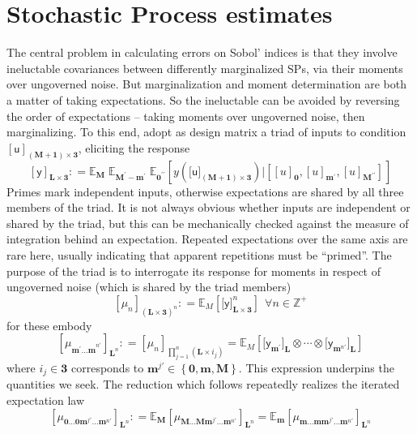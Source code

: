 \documentclass[preprint,12pt]{elsarticle}
\newcommand*{\M}[1]{\ensuremath{#1}\xspace}
\newcommand*{\x}{\times}
\newcommand*{\mi}[1]{\mathbf{#1}}
\newcommand*{\st}[1]{\mathbb{#1}}
\newcommand*{\rv}[1]{\mathsf{#1}}
\newcommand*{\te}[2][]{\left\lbrack{#2}\right\rbrack_{#1}}
\newcommand*{\tte}[2][]{\lbrack{#2}\rbrack_{#1}}
\newcommand*{\deq}{\M{\mathrel{\mathop:}=}}
\newcommand*{\ev}[3][]{\mathbb{E}_{#3}^{#1}\!\left\lbrack{#2}\right\rbrack}
\newcommand*{\evt}[3][]{\mathbb{E}_{#3}^{#1}\!#2}
\newcommand*{\set}[1]{\M{\left\lbrace{#1}\right\rbrace}}
\begin{document}
\section{Stochastic Process estimates}\label{sec:SPEst}
    The central problem in calculating errors on Sobol' indices is that they involve ineluctable covariances between differently marginalized SPs, via their moments over ungoverned noise. But marginalization and moment determination are both a matter of taking expectations. So the ineluctable can be avoided by reversing the order of expectations -- taking moments over ungoverned noise, then marginalizing.
    To this end, adopt as design matrix a triad of inputs to condition $\te[\mi{(M+1)\x 3}]{\rv{u}}$, eliciting the response
    \begin{equation}\label{def:SPEst:y}
        \te[\mi{L\x 3}]{\rv{y}} \deq 
        \evt{\;\evt{\;\ev{y(\tte[\mi{(M+1)\x 3}]{\rv{u}}) 
            \big\vert \te[]{\te[\mi{0}]{u}, \te[\mi{m^{\prime}}]{u}, \te[\mi{M^{\prime\prime}}]{u}}}{\mi{0^{\prime\prime}}}}
        {\mi{M^{\prime}-m^{\prime}}}}{\mi{M}}
    \end{equation}
    Primes mark independent inputs, otherwise expectations are shared by all three members of the triad. It is not always obvious whether inputs are independent or shared by the triad, but this can be mechanically checked against the measure of integration behind an expectation. Repeated expectations over the same axis are rare here, usually indicating that apparent repetitions must be ``primed''. The purpose of the triad is to interrogate its response for moments in respect of ungoverned noise (which is shared by the triad members)
    \begin{equation}\label{def:SPEst:mu}
            \te[(\mi{L\x 3})^{n}]{\mu_{n}} \deq \ev{\tte[\mi{L\x 3}]{\rv{y}}^{n}}{M} \ \ \forall n \in \st{Z}^{+}
    \end{equation}
    for these embody
    \begin{equation*}
        \te[\mi{L}^{n}]{\mu_{\mi{m^{\prime}\ldots m}^{n\prime}}} \deq \te[\prod_{j=1}^{n}(\mi{L\x}i_{j})]{\mu_{n}} = \ev{\tte[\mi{L}]{\rv{y}_{\mi{m}^{\prime}}}\otimes\cdots\otimes\tte[\mi{L}]{\rv{y}_{\mi{m}^{n\prime}}}}{M}
    \end{equation*}
    where $i_{j}\in \mi{3}$ corresponds to $\mi{m}^{j\prime} \in \set{\mi{0},\mi{m},\mi{M}}$. This expression underpins the quantities we seek. The reduction which follows repeatedly realizes the iterated expectation law
    \begin{equation}\label{eq:SPEst:reduction}
        \te[\mi{L}^{n}]{\mu_{\mi{0\ldots 0}\mi{m}^{j\prime}\mi{\ldots m}^{n\prime}}} \deq 
        \evt{\te[\mi{L}^{n}]{\mu_{\mi{M\ldots M}\mi{m}^{j\prime}\mi{\ldots m}^{n\prime}}}}{\mi{M}} = 
        \evt{\te[\mi{L}^{n}]{\mu_{\mi{m\ldots m}\mi{m}^{j\prime}\mi{\ldots m}^{n\prime}}}}{\mi{m}}
    \end{equation}
\end{document}
